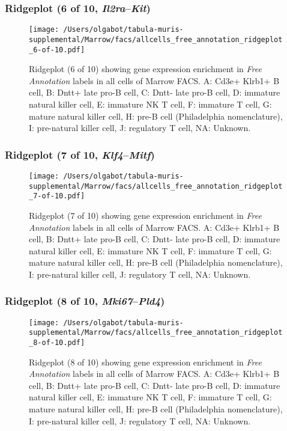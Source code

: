 \clearpage

\subsubsection{Ridgeplot (6 of 10, \emph{Il2ra}--\emph{Kit})}
\begin{figure}[h]
\centering
\texttt{[image: /Users/olgabot/tabula-muris-supplemental/Marrow/facs/allcells\_free\_annotation\_ridgeplot\_6-of-10.pdf]}

\caption{ Ridgeplot (6 of 10)  showing gene expression enrichment in \emph{Free Annotation} labels in all cells of Marrow FACS. A: Cd3e+ Klrb1+ B cell, B: Dntt+ late pro-B cell, C: Dntt- late pro-B cell, D: immature natural killer cell, E: immature NK T cell, F: immature T cell, G: mature natural killer cell, H: pre-B cell (Philadelphia nomenclature), I: pre-natural killer cell, J: regulatory T cell, NA: Unknown.}
\end{figure}


\clearpage

\subsubsection{Ridgeplot (7 of 10, \emph{Klf4}--\emph{Mitf})}
\begin{figure}[h]
\centering
\texttt{[image: /Users/olgabot/tabula-muris-supplemental/Marrow/facs/allcells\_free\_annotation\_ridgeplot\_7-of-10.pdf]}

\caption{ Ridgeplot (7 of 10)  showing gene expression enrichment in \emph{Free Annotation} labels in all cells of Marrow FACS. A: Cd3e+ Klrb1+ B cell, B: Dntt+ late pro-B cell, C: Dntt- late pro-B cell, D: immature natural killer cell, E: immature NK T cell, F: immature T cell, G: mature natural killer cell, H: pre-B cell (Philadelphia nomenclature), I: pre-natural killer cell, J: regulatory T cell, NA: Unknown.}
\end{figure}


\clearpage

\subsubsection{Ridgeplot (8 of 10, \emph{Mki67}--\emph{Pld4})}
\begin{figure}[h]
\centering
\texttt{[image: /Users/olgabot/tabula-muris-supplemental/Marrow/facs/allcells\_free\_annotation\_ridgeplot\_8-of-10.pdf]}

\caption{ Ridgeplot (8 of 10)  showing gene expression enrichment in \emph{Free Annotation} labels in all cells of Marrow FACS. A: Cd3e+ Klrb1+ B cell, B: Dntt+ late pro-B cell, C: Dntt- late pro-B cell, D: immature natural killer cell, E: immature NK T cell, F: immature T cell, G: mature natural killer cell, H: pre-B cell (Philadelphia nomenclature), I: pre-natural killer cell, J: regulatory T cell, NA: Unknown.}
\end{figure}


